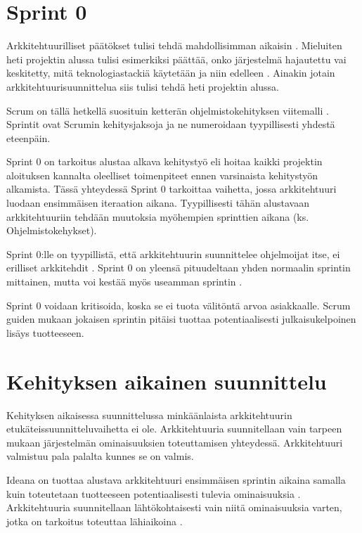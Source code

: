 \section{Sprint 0}

Arkkitehtuurilliset päätökset tulisi tehdä mahdollisimman aikaisin \citep{abrahamsson2010agility}. Mieluiten heti projektin alussa tulisi esimerkiksi päättää, onko järjestelmä hajautettu vai keskitetty, mitä teknologiastackiä käytetään ja niin edelleen \citep{eloranta2015techniques}. Ainakin jotain arkkitehtuurisuunnittelua siis tulisi tehdä heti projektin alussa.

Scrum on tällä hetkellä suosituin ketterän ohjelmistokehityksen viitemalli \citep{noauthor_14th_2020}. Sprintit ovat Scrumin kehitysjaksoja ja ne numeroidaan tyypillisesti yhdestä eteenpäin.

Sprint 0 on tarkoitus alustaa alkava kehitystyö eli hoitaa kaikki projektin aloituksen kannalta oleelliset toimenpiteet ennen varsinaista kehitystyön alkamista. Tässä yhteydessä Sprint 0 tarkoittaa vaihetta, jossa arkkitehtuuri luodaan ensimmäisen iteraation aikana. Tyypillisesti tähän alustavaan arkkitehtuuriin tehdään muutoksia myöhempien sprinttien aikana (ks. Ohjelmistokehykset). 

Sprint 0:lle on tyypillistä, että arkkitehtuurin suunnittelee ohjelmoijat itse, ei erilliset arkkitehdit \citep{eloranta2015techniques}. Sprint 0 on yleensä pituudeltaan yhden normaalin sprintin mittainen, mutta voi kestää myös useamman sprintin \citep{prause_architectural_2012}.

Sprint 0 voidaan kritisoida, koska se ei tuota välitöntä arvoa asiakkaalle.
Scrum guiden mukaan jokaisen sprintin pitäisi tuottaa potentiaalisesti julkaisukelpoinen lisäys tuotteeseen.

\section{Kehityksen aikainen suunnittelu}
Kehityksen aikaisessa suunnittelussa minkäänlaista arkkitehtuurin etukäteissuunnitteluvaihetta ei ole. Arkkitehtuuria suunnitellaan vain tarpeen mukaan järjestelmän ominaisuuksien toteuttamisen yhteydessä. Arkkitehtuuri valmistuu pala palalta kunnes se on valmis.

Ideana on tuottaa alustava arkkitehtuuri ensimmäisen sprintin aikaina samalla kuin toteutetaan tuotteeseen potentiaalisesti tulevia ominaisuuksia \citep{eloranta2015techniques}. Arkkitehtuuria suunnitellaan lähtökohtaisesti vain niitä ominaisuuksia varten, jotka on tarkoitus toteuttaa lähiaikoina \citep{waterman_how_2015}. 

